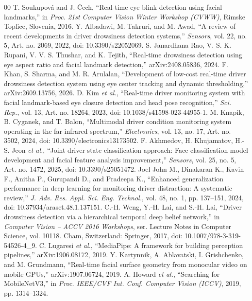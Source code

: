 \documentclass[conference]{IEEEtran}
\begin{document}
\begin{thebibliography}{00}
 T. Soukupov\'a and J. \v{C}ech, ``Real-time eye blink detection using facial landmarks,'' in \emph{Proc. 21st Computer Vision Winter Workshop (CVWW)}, Rimske Toplice, Slovenia, 2016.
 Y. Albadawi, M. Takruri, and M. Awad, ``A review of recent developments in driver drowsiness detection systems,'' \emph{Sensors}, vol. 22, no. 5, Art. no. 2069, 2022, doi: 10.3390/s22052069.
 S. Janardhana Rao, V. S. K. Rupani, V. V. S. Thushar, and K. Tejith, ``Real-time drowsiness detection using eye aspect ratio and facial landmark detection,'' arXiv:2408.05836, 2024.
 F. Khan, S. Sharma, and M. R. Arulalan, ``Development of low-cost real-time driver drowsiness detection system using eye center tracking and dynamic thresholding,'' arXiv:2609.13756, 2026. 
 D. Kim \emph{et al.}, ``Real-time driver monitoring system with facial landmark-based eye closure detection and head pose recognition,'' \emph{Sci. Rep.}, vol. 13, Art. no. 18264, 2023, doi: 10.1038/s41598-023-44955-1. 
 M. Knapik, B. Cyganek, and T. Balon, ``Multimodal driver condition monitoring system operating in the far-infrared spectrum,'' \emph{Electronics}, vol. 13, no. 17, Art. no. 3502, 2024, doi: 10.3390/electronics13173502. 
 F. Akhmedov, H. Khujamatov, H.-S. Jeon \emph{et al.}, ``Joint driver state classification approach: Face classification model development and facial feature analysis improvement,'' \emph{Sensors}, vol. 25, no. 5, Art. no. 1472, 2025, doi: 10.3390/s25051472. 
 Joel John M., Dinakaran K., Kavin F., Anitha P., Gurupandi D., and Pradeepa K., ``Enhanced generalization performance in deep learning for monitoring driver distraction: A systematic review,'' \emph{J. Adv. Res. Appl. Sci. Eng. Technol.}, vol. 48, no. 1, pp. 137--151, 2024, doi: 10.37934/araset.48.1.137151. 
 C.-H. Weng, Y.-H. Lai, and S.-H. Lai, ``Driver drowsiness detection via a hierarchical temporal deep belief network,'' in \emph{Computer Vision -- ACCV 2016 Workshops}, ser. Lecture Notes in Computer Science, vol. 10118. Cham, Switzerland: Springer, 2017, doi: 10.1007/978-3-319-54526-4\_9.
 C. Lugaresi \emph{et al.}, ``MediaPipe: A framework for building perception pipelines,'' arXiv:1906.08172, 2019.
 Y. Kartynnik, A. Ablavatski, I. Grishchenko, and M. Grundmann, ``Real-time facial surface geometry from monocular video on mobile GPUs,'' arXiv:1907.06724, 2019.
 A. Howard \emph{et al.}, ``Searching for MobileNetV3,'' in \emph{Proc. IEEE/CVF Int. Conf. Computer Vision (ICCV)}, 2019, pp. 1314--1324. 

\end{thebibliography}
\end{document}
